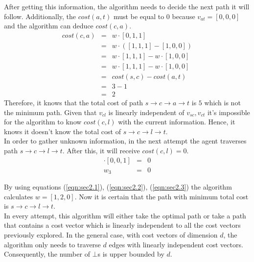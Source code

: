 After getting this information, the algorithm needs to decide the next path it will follow. Additionally, the $cost(a,t)$ must be equal to $0$ because $v_{at} = [0,0,0]$ and the algorithm can deduce $cost(c,a)$.
\begin{eqnarray*}
  cost(c,a) &=&  w \cdot [0,1,1] \\
  &=&  w \cdot ([1,1,1] - [1,0,0]) \\
  &=&  w \cdot [1,1,1] - w \cdot [1,0,0] \\
  &=&  w \cdot [1,1,1] - w \cdot [1,0,0] \\
  &=&  cost(s,c) - cost(a,t) \\
  &=&  3 - 1 \\
  &=&  2
\end{eqnarray*}
Therefore, it knows that the total cost of path $s \to c \to a \to t$ is $5$ which is not the minimum path.
Given that $v_{cl}$ is linearly independent of $v_{sc},v_{ct}$ it's impossible for the algorithm to know $cost(c,l)$ with the current information. Hence, it knows it doesn't know the total cost of $s \to c \to l \to t$. \\

In order to gather unknown information, in the next attempt the agent traverses path $s \to c \to l \to t$. After this, it will receive $cost(c,l) = 0$.
\begin{eqnarray}
  [w_1,w_2,w_3] \cdot [0,0,1] &=& 0 \nonumber\\
  w_3 &=& 0 \label{eqn:sec2.3}
\end{eqnarray}

By using equations (\ref{eqn:sec2.1}), (\ref{eqn:sec2.2}), (\ref{eqn:sec2.3}) the algorithm calculates $w=[1,2,0]$.
Now it is certain that the path with minimum total cost is $s \to c \to l \to t$. \\

In every attempt, this algorithm will either take the optimal path or take a path that contains a cost vector which is linearly independent to all the cost vectors previously explored. In the general case, with cost vectors of dimension $d$, the algorithm only needs to traverse $d$ edges with linearly independent cost vectors. Consequently, the number of $\bot$s is upper bounded by $d$.
